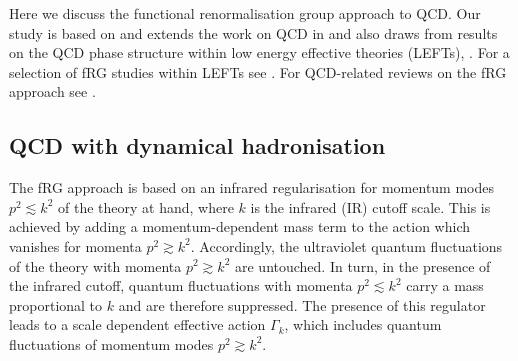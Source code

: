 \documentclass[%
reprint,
superscriptaddress,
showpacs,preprintnumbers,
 amsmath,amssymb,
 aps,
prd,
]{revtex4-1}
\begin{document}
Here we discuss the functional renormalisation group approach to
QCD. Our study is based on and extends the work on QCD in
\cite{Braun:2007bx, Braun:2008pi, Braun:2009gm, Mitter:2014wpa,
  Braun:2014ata, Rennecke:2015eba, Cyrol:2016tym, Cyrol:2017ewj,
  Cyrol:2017qkl} and also draws from results on the QCD phase
structure within low energy effective theories (LEFTs),
\cite{Pawlowski:2014zaa, Fu:2015naa, Fu:2015amv, Fu:2016tey,
  Rennecke:2016tkm, Braun:2017srn, Fu:2018qsk, Fu:2018swz,
  Braun:2018bik}. For a selection of fRG studies within LEFTs see
\cite{Schaefer:2004en,Schaefer:2006ds, Herbst:2010rf, Skokov:2010wb,
  Skokov:2010uh, Braun:2011iz, Strodthoff:2011tz, Fukushima:2012xw,
  Aoki:2012mj, Kamikado:2012cp,Jiang:2012wm,Haas:2013qwp,
  Herbst:2013ufa, Herbst:2013ail, Tripolt:2013zfa, Grahl:2013pba,
  Mitter:2013fxa, Herbst:2013ufa, Morita:2013tu, Pawlowski:2014zaa,
  Helmboldt:2014iya,Khan:2015puu, Wang:2015bky,
  Mueller:2015fka,Eser:2015pka, Weyrich:2015hha, Fu:2015naa,
  Aoki:2015mqa, Fejos:2015xca, Jiang:2015xqz, Fu:2015amv, Fu:2016tey,
  Rennecke:2016tkm, Jung:2016yxl, Fejos:2016hbp, Almasi:2016zqf,
  Posfay:2016ygf, Yokota:2016tip, Springer:2016cji,Resch:2017vjs,
  Tripolt:2017zgc, Braun:2017srn, Fejos:2017kpq, Yokota:2017uzu,
  Almasi:2017bhq, Zhang:2017icm, Aoki:2017rjl, Braun:2018bik,
  Fejos:2018dyy, Braun:2018svj, Fu:2018qsk, Fu:2018swz, Sun:2018ozp,
  Wen:2018nkn, Yin:2019ebz, Leonhardt:2019fua,Li:2019nzj}. For
QCD-related reviews on the fRG approach see
\cite{Berges:2000ew, Pawlowski:2005xe, Schaefer:2006sr, Gies:2006wv,
  Rosten:2010vm, Braun:2011pp, Pawlowski:2014aha}.


\subsection{QCD with dynamical hadronisation}
\label{sec:FlowQCD}


The fRG approach is based on an infrared regularisation for momentum
modes $p^2 \lesssim k^2$ of the theory at hand, where $k$ is the
infrared (IR) cutoff scale. This is achieved by adding a
momentum-dependent mass term to the action which vanishes for momenta
$p^2\gtrsim k^2$. Accordingly, the ultraviolet quantum fluctuations of
the theory with momenta $p^2 \gtrsim k^2$ are untouched. In turn, in
the presence of the infrared cutoff, quantum fluctuations with momenta
$p^2\lesssim k^2$ carry a mass proportional to $k$ and are therefore
suppressed.  The presence of this regulator leads to a scale dependent
effective action $\Gamma_k$, which includes quantum fluctuations of
momentum modes $p^2 \gtrsim k^2$.
\end{document}
